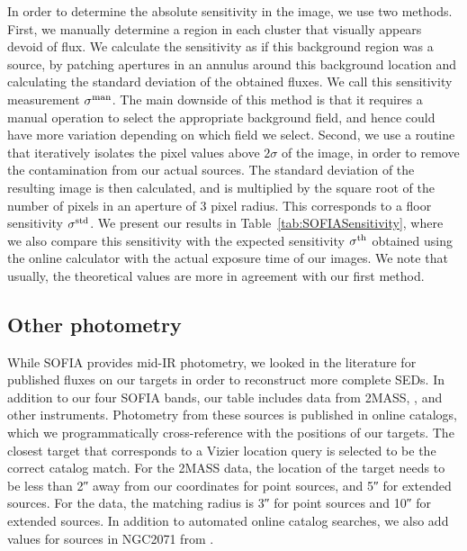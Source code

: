 \begin{table}[!ht]
\label{tab:SOFIASensitivity}
\end{table}

In order to determine the absolute sensitivity in the image, we use two methods. First, we manually determine a region in each cluster that visually appears devoid of flux. We calculate the sensitivity as if this background region was a source, by patching apertures in an annulus around this background location and calculating the standard deviation of the obtained fluxes. We call this sensitivity measurement $\sigma^\textrm{man}$. The main downside of this method is that it requires a manual operation to select the appropriate background field, and hence could have more variation depending on which field we select. Second, we use a routine that iteratively isolates the pixel values above $2\sigma$ of the image, in order to remove the contamination from our actual sources. The standard deviation of the resulting image is then calculated, and is multiplied by the square root of the number of pixels in an aperture of 3 pixel radius. This corresponds to a floor sensitivity $\sigma^\textrm{std}$. We present our results in Table~\ref{tab:SOFIASensitivity}, where we also compare this sensitivity with the expected sensitivity $\sigma^\textrm{th}$ obtained using the online calculator with the actual exposure time of our images. We note that usually, the theoretical values are more in agreement with our first method. 



\subsection{Other photometry}

While SOFIA provides mid-IR photometry, we looked in the literature for published fluxes on our targets in order to reconstruct more complete SEDs. In addition to our four SOFIA bands, our table includes data from 2MASS, \Spitzer, and other instruments. Photometry from these sources is published in online catalogs, which we programmatically cross-reference with the positions of our targets. The closest target that corresponds to a Vizier location query is selected to be the correct catalog match. For the 2MASS data, the location of the target needs to be less than \ang{;;2} away from our coordinates for point sources, and \ang{;;5} for extended sources. For the \Spitzer data, the matching radius is \ang{;;3} for point sources and \ang{;;10} for extended sources. In addition to automated online catalog searches, we also add values for sources in NGC2071 from \citet{vanKempen:2012fb}.

